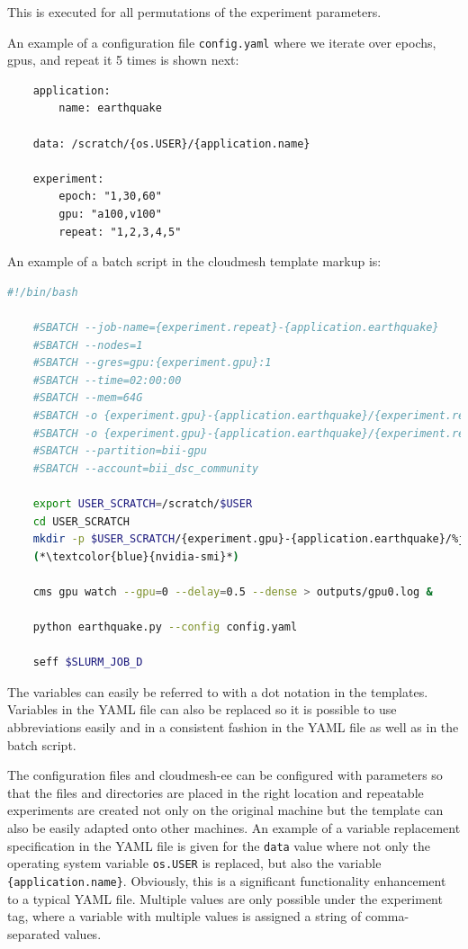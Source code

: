 This is executed for all permutations of the experiment parameters.

An example of a configuration file \verb|config.yaml| where we iterate over epochs, gpus, and repeat it 5 times is shown next:

\begin{lstlisting}
    application:
        name: earthquake

    data: /scratch/{os.USER}/{application.name}
       
    experiment:
        epoch: "1,30,60"
        gpu: "a100,v100"
        repeat: "1,2,3,4,5"
\end{lstlisting}

An example of a batch script in the cloudmesh template markup  is:

\begin{lstlisting}[language=sh]
    #!/bin/bash

    #SBATCH --job-name={experiment.repeat}-{application.earthquake}
    #SBATCH --nodes=1
    #SBATCH --gres=gpu:{experiment.gpu}:1
    #SBATCH --time=02:00:00
    #SBATCH --mem=64G
    #SBATCH -o {experiment.gpu}-{application.earthquake}/{experiment.repeat}-%j.out
    #SBATCH -o {experiment.gpu}-{application.earthquake}/{experiment.repeat}-%j.err
    #SBATCH --partition=bii-gpu
    #SBATCH --account=bii_dsc_community

    export USER_SCRATCH=/scratch/$USER
    cd USER_SCRATCH
    mkdir -p $USER_SCRATCH/{experiment.gpu}-{application.earthquake}/%j.out
    (*\textcolor{blue}{nvidia-smi}*)

    cms gpu watch --gpu=0 --delay=0.5 --dense > outputs/gpu0.log &

    python earthquake.py --config config.yaml

    seff $SLURM_JOB_D
\end{lstlisting}

The variables can easily be referred to with a dot notation in the templates.  Variables in the YAML file can also be replaced so it is possible to use abbreviations easily and in a consistent fashion in the YAML file as well as in the batch script.

The configuration files and cloudmesh-ee can be configured with parameters so that the files and directories are placed in the right location and repeatable experiments are created not only on the original machine but the template can also be easily adapted onto other machines. An example of a variable replacement specification in the YAML file is given for the \verb|data| value where not only the operating system variable \verb|os.USER| is replaced, but also the variable \verb|{application.name}|. Obviously, this is a significant functionality enhancement to a typical YAML file.  Multiple values are only possible under the experiment tag, where a variable with multiple values is assigned a string of comma-separated values.

